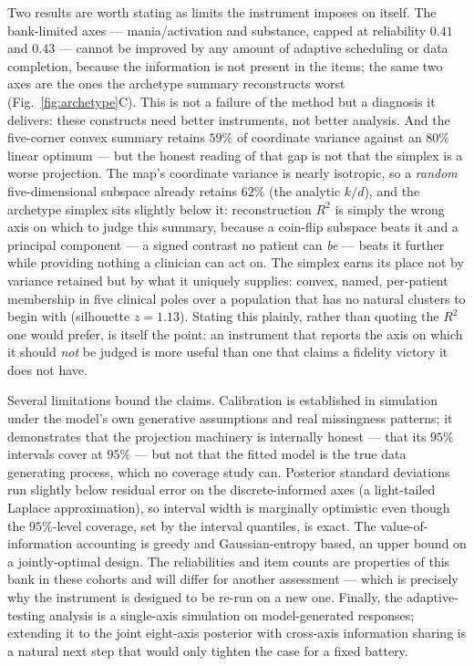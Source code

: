 Two results are worth stating as limits the instrument imposes on itself. The
bank-limited axes --- mania/activation and substance, capped at reliability $0.41$
and $0.43$ --- cannot be improved by any amount of adaptive scheduling or data
completion, because the information is not present in the items; the same two axes
are the ones the archetype summary reconstructs worst
(Fig.~\ref{fig:archetype}C). This is not a failure of the method but a diagnosis it
delivers: these constructs need better instruments, not better analysis. And the
five-corner convex summary retains $59\%$ of coordinate variance against an $80\%$
linear optimum --- but the honest reading of that gap is not that the simplex is a
worse projection. The map's coordinate variance is nearly isotropic, so a
\emph{random} five-dimensional subspace already retains $62\%$ (the analytic $k/d$),
and the archetype simplex sits slightly below it: reconstruction $R^2$ is simply the
wrong axis on which to judge this summary, because a coin-flip subspace beats it and
a principal component --- a signed contrast no patient can \emph{be} --- beats it
further while providing nothing a clinician can act on. The simplex earns its place
not by variance retained but by what it uniquely supplies: convex, named, per-patient
membership in five clinical poles over a population that has no natural clusters to
begin with (silhouette $z=1.13$). Stating this plainly, rather than quoting the $R^2$
one would prefer, is itself the point: an instrument that reports the axis on which
it should \emph{not} be judged is more useful than one that claims a fidelity victory
it does not have.

Several limitations bound the claims. Calibration is established in simulation
under the model's own generative assumptions and real missingness patterns; it
demonstrates that the projection machinery is internally honest --- that its
$95\%$ intervals cover at $95\%$ --- but not that the fitted model is the true data
generating process, which no coverage study can. Posterior standard deviations run
slightly below residual error on the discrete-informed axes (a light-tailed Laplace
approximation), so interval width is marginally optimistic even though the
$95\%$-level coverage, set by the interval quantiles, is exact. The
value-of-information accounting is greedy and Gaussian-entropy based, an upper bound
on a jointly-optimal design. The reliabilities and item counts are properties of
this bank in these cohorts and will differ for another assessment --- which is
precisely why the instrument is designed to be re-run on a new one. Finally, the
adaptive-testing analysis is a single-axis simulation on model-generated responses;
extending it to the joint eight-axis posterior with cross-axis information sharing
is a natural next step that would only tighten the case for a fixed battery.

